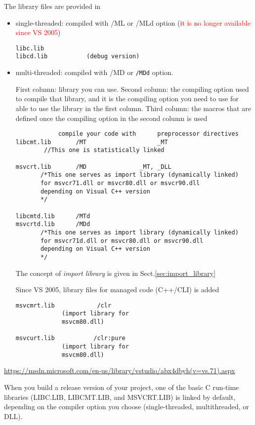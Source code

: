 The library files are provided in 
\begin{itemize}
  
  \item single-threaded: compiled with /ML or /MLd option (\textcolor{red}{it is
  no longer available since VS 2005})

\begin{verbatim}
libc.lib
libcd.lib           (debug version)
\end{verbatim}  
  
  \item multi-threaded: compiled with /MD or \verb!/MDd! option.
  
First column: library you can use. Second column: the compiling option used to
compile that library, and it is the compiling option you need to use for able to
use the library in the first column. Third column: the macros that are defined
once the compiling option in the second column is used
  
\begin{verbatim}
            compile your code with      preprocessor directives
libcmt.lib       /MT                    _MT
        //This one is statistically linked
        
msvcrt.lib       /MD               _MT, _DLL
       /*This one serves as import library (dynamically linked)
       for msvcr71.dll or msvcr80.dll or msvcr90.dll
       depending on Visual C++ version
       */ 

libcmtd.lib      /MTd
msvcrtd.lib      /MDd
       /*This one serves as import library (dynamically linked)
       for msvcr71d.dll or msvcr80.dll or msvcr90.dll
       depending on Visual C++ version
       */
\end{verbatim}
The concept of {\it import library} is given in Sect.\ref{sec:import_library}

Since VS 2005, library files for managed code (C++/CLI) is added
\begin{verbatim}
msvcmrt.lib            /clr
             (import library for
             msvcm80.dll)
             
msvcurt.lib           /clr:pure
             (import library for
             msvcm80.dll)             
\end{verbatim}
\end{itemize}
\url{https://msdn.microsoft.com/en-us/library/vstudio/abx4dbyh(v=vs.71).aspx}

When you build a release version of your project, one of the basic C run-time
libraries (LIBC.LIB, LIBCMT.LIB, and MSVCRT.LIB) is linked by default, depending
on the compiler option you choose (single-threaded, multithreaded, or DLL).

